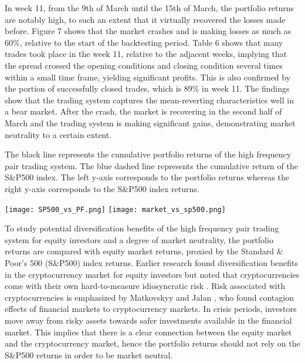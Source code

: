 \documentclass[12pt,english,authoryear]{article}
\begin{document}
In week 11, from the 9th of March until the 15th of March, the portfolio returns are notably high, to such an extent that it virtually recovered the losses made before. Figure 7 shows that the market crashes and is making losses as much as 60\%, relative to the start of the backtesting period. Table 6 shows that many trades took place in the week 11, relative to the adjacent weeks, implying that the spread crossed the opening conditions and closing condition several times within a small time frame, yielding significant profits. This is also confirmed by the portion of successfully closed trades, which is 89\% in week 11. The findings show that the trading system captures the mean-reverting characteristics well in a bear market. After the crash, the market is recovering in the second half of March and the trading system is making significant gains, demonstrating market neutrality to a certain extent. 

\begin{center}
\begin{minipage}{\textwidth}
\caption*{\footnotesize The black line represents the cumulative portfolio returns of the high frequency pair trading system. The blue dashed line represents the cumulative return of the S\&P500 index. The left y-axis corresponds to the portfolio returns whereas the right y-axis corresponds to the S\&P500 index returns.}
\texttt{[image: SP500\_vs\_PF.png]}
\texttt{[image: market\_vs\_sp500.png]}
\end{minipage}
\end{center}

To study potential diversification benefits of the high frequency pair trading system for equity investors and a degree of market neutrality, the portfolio returns are compared with equity market returns, proxied by the Standard \& Poor's 500 (S\&P500) index returns. Earlier research found diversification benefits in the cryptocurrency market for equity investors but noted that cryptocurrencies come with their own hard-to-measure idiosyncratic risk \cite{Corbet_2018}. Risk associated with cryptocurrencies is emphasized by Matkovskyy and Jalan \citeyear{Matkovskyy_2019}, who found contagion effects of financial markets to cryptocurrency markets. In crisis periods, investors move away from risky assets towards safer investments available in the financial market. This implies that there is a clear connection between the equity market and the cryptocurrency market, hence the portfolio returns should not rely on the S\&P500 returns in order to be market neutral.
\end{document}
